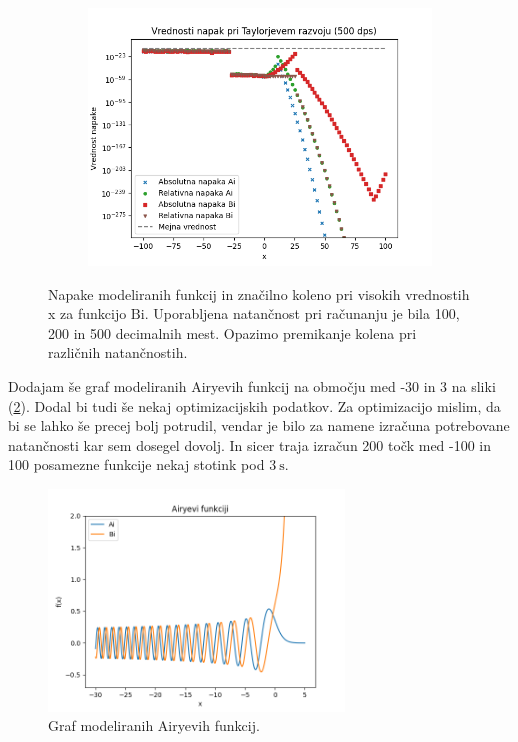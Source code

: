 \documentclass[12pt]{article}
\newcommand{\Bi}{\mathrm{Bi}}
\begin{document}
\begin{figure}
\begin{subfigure}{0.45\textwidth}
        \includegraphics[width=\textwidth]{NapakeZlepek500.png}
    \end{subfigure}
    \caption{\label{fig:Zlepki} Napake modeliranih funkcij in značilno koleno pri visokih vrednostih x za funkcijo $\Bi$. Uporabljena natančnost pri računanju je bila 100, 200 in 500 decimalnih mest. Opazimo premikanje kolena pri različnih natančnostih.}
\end{figure}

\par
Dodajam še graf modeliranih Airyevih funkcij na območju med -30 in 3 na sliki (\ref{fig:graf}). Dodal bi tudi še nekaj optimizacijskih podatkov. Za optimizacijo mislim, da bi se lahko še precej bolj potrudil, vendar je bilo za namene izračuna potrebovane natančnosti kar sem dosegel dovolj. In sicer traja izračun 200 točk med -100 in 100 posamezne funkcije nekaj stotink pod $\SI{3}{\second}$.

\begin{figure}
    \centering
    \includegraphics[width=0.7\textwidth]{Graf.png}
    \caption{\label{fig:graf} Graf modeliranih Airyevih funkcij.}
\end{figure}
\end{document}
